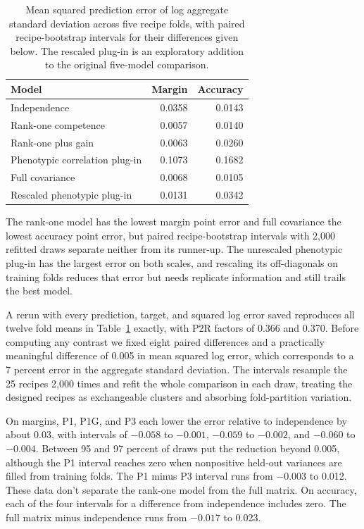 \begin{table}[!htb]
\centering
\caption{Mean squared prediction error of log aggregate standard deviation across five recipe folds, with paired recipe-bootstrap intervals for their differences given below. The rescaled plug-in is an exploratory addition to the original five-model comparison.}
\label{tab:prediction}
\small\setlength{\tabcolsep}{4pt}\renewcommand{\arraystretch}{1.12}
\begin{tabular}{lrr}
\toprule
Model & Margin & Accuracy\\
\midrule
Independence & 0.0358 & 0.0143\\
Rank-one competence & 0.0057 & 0.0140\\
Rank-one plus gain & 0.0063 & 0.0260\\
Phenotypic correlation plug-in & 0.1073 & 0.1682\\
Full covariance & 0.0068 & 0.0105\\
Rescaled phenotypic plug-in & 0.0131 & 0.0342\\
\bottomrule
\end{tabular}
\end{table}

The rank-one model has the lowest margin point error and full covariance the lowest accuracy point error, but paired recipe-bootstrap intervals with 2,000 refitted draws separate neither from its runner-up. The unrescaled phenotypic plug-in has the largest error on both scales, and rescaling its off-diagonals on training folds reduces that error but needs replicate information and still trails the best model.

A rerun with every prediction, target, and squared log error saved reproduces all twelve fold means in Table~\ref{tab:prediction} exactly, with P2R factors of 0.366 and 0.370. Before computing any contrast we fixed eight paired differences and a practically meaningful difference of 0.005 in mean squared log error, which corresponds to a 7 percent error in the aggregate standard deviation. The intervals resample the 25 recipes 2,000 times and refit the whole comparison in each draw, treating the designed recipes as exchangeable clusters and absorbing fold-partition variation.

On margins, P1, P1G, and P3 each lower the error relative to independence by about 0.03, with intervals of $-0.058$ to $-0.001$, $-0.059$ to $-0.002$, and $-0.060$ to $-0.004$. Between 95 and 97 percent of draws put the reduction beyond 0.005, although the P1 interval reaches zero when nonpositive held-out variances are filled from training folds. The P1 minus P3 interval runs from $-0.003$ to 0.012. These data don't separate the rank-one model from the full matrix. On accuracy, each of the four intervals for a difference from independence includes zero. The full matrix minus independence runs from $-0.017$ to 0.023.

